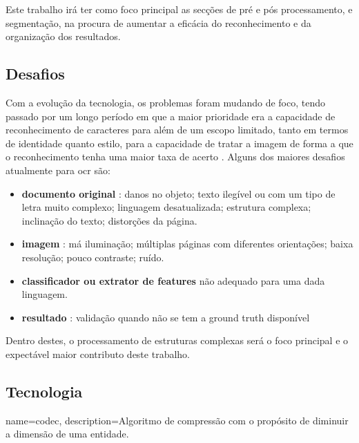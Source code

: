 Este trabalho irá ter como foco principal as secções de pré e pós processamento, e segmentação, na procura de aumentar a eficácia do reconhecimento e da organização dos resultados.



\subsection{Desafios}
\label{ocr_desafios}


Com a evolução da tecnologia, os problemas foram mudando de foco, tendo passado por um longo período em que a maior prioridade era a capacidade de reconhecimento de caracteres para além de um escopo limitado, tanto em termos de identidade quanto estilo, para a capacidade de tratar a imagem de forma a que o reconhecimento tenha uma maior taxa de acerto \citep{4283429}.
Alguns dos maiores desafios atualmente para \acrshort{ocr} são:
\begin{itemize}
    \item \textbf{documento original} : danos  no objeto; texto ilegível ou com um tipo de letra muito complexo; linguagem desatualizada; estrutura complexa; inclinação do texto; distorções da página.
    \item \textbf{imagem} : má iluminação; múltiplas páginas com diferentes orientações; baixa resolução; pouco contraste; ruído.
    \item \textbf{classificador ou extrator de features} não adequado para uma dada linguagem.
    \item \textbf{resultado} : validação quando não se tem a \gls{ground truth} disponível
\end{itemize}

Dentro destes, o processamento de estruturas complexas será o foco principal e o expectável maior contributo deste trabalho.


\subsection{Tecnologia}

{
    name=codec,
    description={Algoritmo de compressão com o propósito de diminuir a dimensão de uma entidade.}
}


